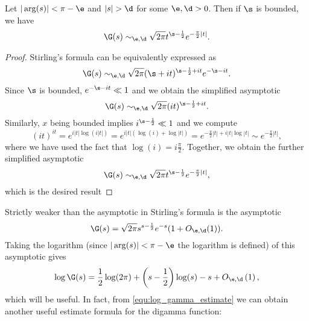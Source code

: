     \begin{corollary}\label{equ:weaker_Stirling_formula}
    Let $|\arg(s)| < \pi-\e$ and $|s| > \d$ for some $\e,\d > 0$. Then if $\s$ is bounded, we have
      \[
        \G(s) \sim_{\e,\d} \sqrt{2\pi}t^{\s-\frac{1}{2}}e^{-\frac{\pi}{2}|t|}.
      \]
    \end{corollary}
    \begin{proof}
      Stirling's formula can be equivalently expressed as
      \[
        \G(s) \sim_{\e,\d} \sqrt{2\pi}(\s+it)^{\s-\frac{1}{2}+it}e^{-\s-it}.
      \]
      Since $\s$ is bounded, $e^{-\s-it} \ll 1$ and we obtain the simplified asymptotic
      \[
        \G(s) \sim_{\e,\d} \sqrt{2\pi}(it)^{\s-\frac{1}{2}+it}.
      \]
      Similarly, $x$ being bounded implies $i^{\s-\frac{1}{2}} \ll 1$ and we compute
      \[
        (it)^{it} = e^{i|t|\log(i|t|)} = e^{i|t|(\log(i)+\log|t|)} = e^{-\frac{\pi}{2}|t|+i|t|\log|t|} \sim e^{-\frac{\pi}{2}|t|},
      \]
      where we have used the fact that $\log(i) = i\frac{\pi}{2}$. Together, we obtain the further simplified asymptotic
      \[
        \G(s) \sim_{\e,\d} \sqrt{2\pi}t^{\s-\frac{1}{2}}e^{-\frac{\pi}{2}|t|},
      \]
      which is the desired result
    \end{proof}
    Strictly weaker than the asymptotic in Stirling's formula is the asymptotic
    \begin{equation}
        \G(s) = \sqrt{2\pi}s^{s-\frac{1}{2}}e^{-s}(1+O_{\e,\d}(1)).
    \end{equation}
    Taking the logarithm (since $|\arg(s)| < \pi-\e$ the logarithm is defined) of this asymptotic gives
    \begin{equation}\label{equ:log_gamma_estimate}
      \log\G(s) = \frac{1}{2}\log(2\pi)+\left(s-\frac{1}{2}\right)\log(s)-s+O_{\e,\d}\left(1\right),
    \end{equation}
    which will be useful. In fact, from \cref{equ:log_gamma_estimate} we can obtain another useful estimate formula for the digamma function:

